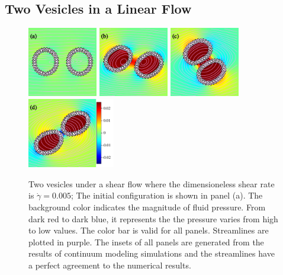 \documentclass[lineno]{jfm}
\begin{document}
%


\subsection{Two Vesicles in a Linear Flow}


\begin{figure}
\centering
\includegraphics[height=1.2in]{N116_shear_0.pdf}
\includegraphics[height=1.2in]{N116_shear_2500.pdf}
\includegraphics[height=1.2in]{N116_shear_5000.pdf}
\includegraphics[height=1.2in]{N116_shear_7500.pdf}\\
  \caption{Two vesicles under a shear flow where the dimensioneless shear rate is $\dot\gamma=0.005$; The initial configuration is shown in panel (a). The background color indicates the magnitude of fluid pressure. From dark red to dark blue, it represents the the pressure varies from high to low values. The color bar is valid for all panels. Streamlines are plotted in purple. The insets of all panels are generated from the results of continuum modeling simulations and the streamlines have a perfect agreement to the numerical results.
  }
    \label{figure9}
\end{figure}
\end{document}
